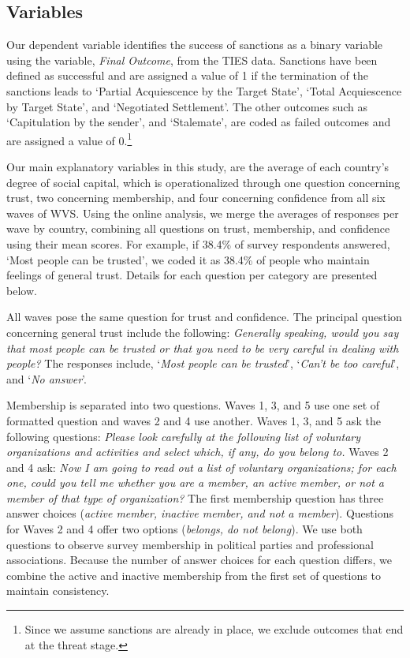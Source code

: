 \documentclass[12pt,]{article}
\begin{document}
\hypertarget{variables}{%
\subsection{Variables}\label{variables}}

Our dependent variable identifies the success of sanctions as a binary
variable using the variable, \emph{Final Outcome}, from the TIES data.
Sanctions have been defined as successful and are assigned a value of 1
if the termination of the sanctions leads to `Partial Acquiescence by
the Target State', `Total Acquiescence by Target State', and `Negotiated
Settlement'. The other outcomes such as `Capitulation by the sender',
and `Stalemate', are coded as failed outcomes and are assigned a value
of 0.\footnote{Since we assume sanctions are already in place, we
  exclude outcomes that end at the threat stage.}

Our main explanatory variables in this study, are the average of each
country's degree of social capital, which is operationalized through one
question concerning trust, two concerning membership, and four
concerning confidence from all six waves of WVS. Using the online
analysis, we merge the averages of responses per wave by country,
combining all questions on trust, membership, and confidence using their
mean scores. For example, if 38.4\% of survey respondents answered,
`Most people can be trusted', we coded it as 38.4\% of people who
maintain feelings of general trust. Details for each question per
category are presented below.

All waves pose the same question for trust and confidence. The principal
question concerning general trust include the following: \emph{Generally
speaking, would you say that most people can be trusted or that you need
to be very careful in dealing with people?} The responses include,
`\emph{Most people can be trusted}', `\emph{Can't be too careful}', and
`\emph{No answer}'.

Membership is separated into two questions. Waves 1, 3, and 5 use one
set of formatted question and waves 2 and 4 use another. Waves 1, 3, and
5 ask the following questions: \emph{Please look carefully at the
following list of voluntary organizations and activities and select
which, if any, do you belong to.} Waves 2 and 4 ask: \emph{Now I am
going to read out a list of voluntary organizations; for each one, could
you tell me whether you are a member, an active member, or not a member
of that type of organization?} The first membership question has three
answer choices (\emph{active member, inactive member, and not a
member}). Questions for Waves 2 and 4 offer two options (\emph{belongs,
do not belong}). We use both questions to observe survey membership in
political parties and professional associations. Because the number of
answer choices for each question differs, we combine the active and
inactive membership from the first set of questions to maintain
consistency.
\end{document}
